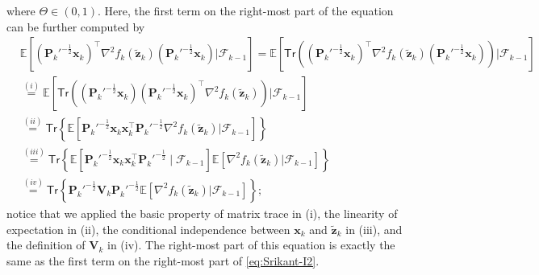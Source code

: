 where $\Theta \in (0,1)$. Here, the first term on the right-most part of the equation can be further computed by
\begin{align}\label{eq:Srikant-I41}
&\mathbb{E}\left[(\bm{P}_k'^{-\frac{1}{2}}\bm{x}_k)^\top \nabla^2f_k(\tilde{\bm{z}}_k)(\bm{P}_k'^{-\frac{1}{2}}\bm{x}_k) \bigg|\mathscr{F}_{k-1}\right] = \mathbb{E}\left[\mathsf{Tr}\left((\bm{P}_k'^{-\frac{1}{2}}\bm{x}_k)^\top \nabla^2f_k(\tilde{\bm{z}}_k)(\bm{P}_k'^{-\frac{1}{2}}\bm{x}_k)\right)\bigg|\mathscr{F}_{k-1}\right]\nonumber \\ 
&\overset{(i)}{=} \mathbb{E}\left[\mathsf{Tr}\left((\bm{P}_k'^{-\frac{1}{2}}\bm{x}_k)(\bm{P}_k'^{-\frac{1}{2}}\bm{x}_k)^\top \nabla^2f_k(\tilde{\bm{z}}_k)\right)\bigg|\mathscr{F}_{k-1}\right]\nonumber\\
&\overset{(ii)}{=} \mathsf{Tr}\left\{\mathbb{E}\left[\bm{P}_k'^{-\frac{1}{2}}\bm{x}_k\bm{x}_k^\top \bm{P}_k'^{-\frac{1}{2}}\nabla^2f_k(\tilde{\bm{z}}_k)\bigg|\mathscr{F}_{k-1}\right]\right\}\nonumber \\ 
&\overset{(iii)}{=}\mathsf{Tr}\left\{\mathbb{E}[\bm{P}_k'^{-\frac{1}{2}}\bm{x}_k\bm{x}_k^\top \bm{P}_k'^{-\frac{1}{2}} \mid \mathscr{F}_{k-1}] \mathbb{E}[\nabla^2f_k(\tilde{\bm{z}}_k)\bigg|\mathscr{F}_{k-1}]\right\}\nonumber \\
&\overset{(iv)}{=}\mathsf{Tr}\left\{\bm{P}_k'^{-\frac{1}{2}}\bm{V}_k \bm{P}_k'^{-\frac{1}{2}}\mathbb{E}[\nabla^2f_k(\tilde{\bm{z}}_k)\bigg|\mathscr{F}_{k-1}]\right\};
\end{align}
notice that we applied the basic property of matrix trace in (i), the linearity of expectation in (ii), the conditional independence between $\bm{x}_k$ and $\tilde{\bm{z}}_k$ in (iii), and the definition of $\bm{V}_k$ in (iv). The right-most part of this equation is exactly the same as the first term on the right-most part of \eqref{eq:Srikant-I2}. 


